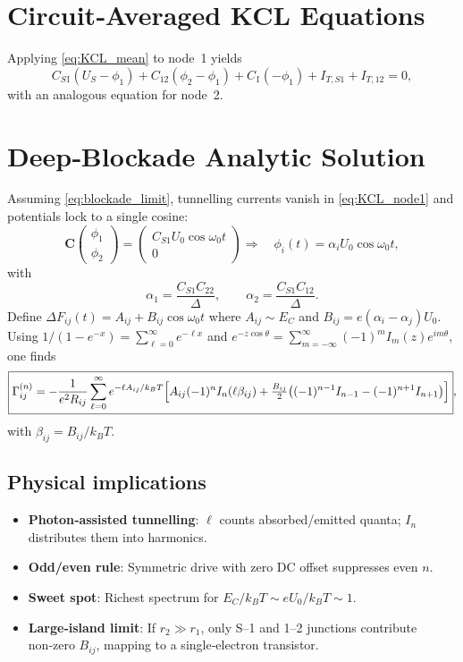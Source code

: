 \documentclass[11pt]{article}
\begin{document}
\section{Circuit‑Averaged KCL Equations}
Applying \eqref{eq:KCL_mean} to node 1 yields
\begin{equation}
 C_{S1}\dot{\!}(U_S-\phi_1)+C_{12}\dot{\!}(\phi_2-\phi_1)+C_1\dot{\!}(-\phi_1)+I_{T,S1}+I_{T,12}=0,
 \label{eq:KCL_node1}
\end{equation}
with an analogous equation for node 2.

\section{Deep‑Blockade Analytic Solution}
\label{sec:harmonics}
Assuming \eqref{eq:blockade_limit}, tunnelling currents vanish in \eqref{eq:KCL_node1} and potentials lock to a single cosine:
\begin{equation}
 \mathbf C\begin{pmatrix}\phi_1\\\phi_2\end{pmatrix}=\begin{pmatrix}C_{S1}U_0\cos\omega_0 t\\0\end{pmatrix}
 \Longrightarrow\quad \phi_i(t)=\alpha_iU_0\cos\omega_0 t,
\end{equation}
with
\begin{equation}
 \alpha_1=\frac{C_{S1}C_{22}}\Delta,\qquad \alpha_2=\frac{C_{S1}C_{12}}\Delta.
\end{equation}
Define $\Delta F_{ij}(t)=A_{ij}+B_{ij}\cos\omega_0 t$ where $A_{ij}\sim E_C$ and $B_{ij}=e(\alpha_i-\alpha_j)U_0$.
Using $1/(1-e^{-x})=\sum_{\ell=0}^{\infty}e^{-\ell x}$ and $e^{-z\cos\theta}=\sum_{m=-\infty}^{\infty}(-1)^mI_m(z)e^{im\theta}$, one finds
\begin{align}
 \boxed{\Gamma_{ij}^{(n)}=-\frac{1}{e^2R_{ij}}\sum_{\ell=0}^{\infty}e^{-\ell A_{ij}/k_BT}
 \Bigl[A_{ij}(-1)^n I_n(\ell\beta_{ij})+\tfrac{B_{ij}}{2}\bigl((-1)^{n-1}I_{n-1}-(-1)^{n+1}I_{n+1}\bigr)\Bigr]},
 \label{eq:harmonics}
\end{align}
with $\beta_{ij}=B_{ij}/k_BT$.
\subsection*{Physical implications}
\begin{itemize}
 \item \textbf{Photon‑assisted tunnelling}: $\ell$ counts absorbed/emitted quanta; $I_n$ distributes them into harmonics.
 \item \textbf{Odd/even rule}: Symmetric drive with zero DC offset suppresses even $n$.
 \item \textbf{Sweet spot}: Richest spectrum for $E_C/k_BT\sim eU_0/k_BT\sim1$.
 \item \textbf{Large‑island limit}: If $r_2\gg r_1$, only S–1 and 1–2 junctions contribute non‑zero $B_{ij}$, mapping to a single‑electron transistor.
\end{itemize}
\end{document}
